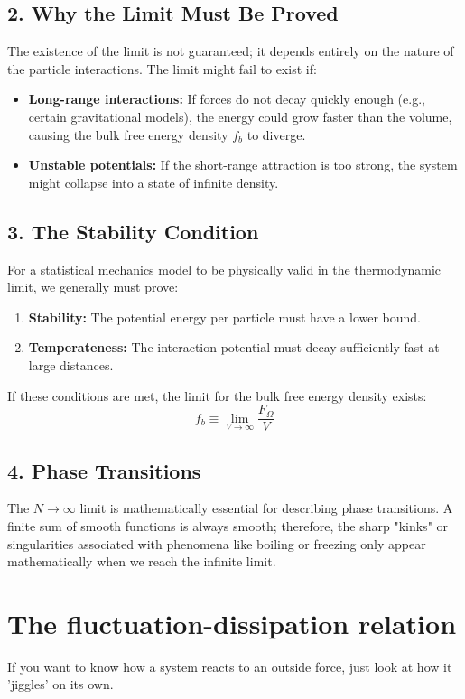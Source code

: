 \documentclass{book}
\begin{document}
\subsection*{2. Why the Limit Must Be Proved}
The existence of the limit is not guaranteed; it depends entirely on the nature of the particle interactions. The limit might fail to exist if:
\begin{itemize}
    \item \textbf{Long-range interactions:} If forces do not decay quickly enough (e.g., certain gravitational models), the energy could grow faster than the volume, causing the bulk free energy density $f_b$ to diverge.
    \item \textbf{Unstable potentials:} If the short-range attraction is too strong, the system might collapse into a state of infinite density.
\end{itemize}

\subsection*{3. The Stability Condition}
For a statistical mechanics model to be physically valid in the thermodynamic limit, we generally must prove:
\begin{enumerate}
    \item \textbf{Stability:} The potential energy per particle must have a lower bound.
    \item \textbf{Temperateness:} The interaction potential must decay sufficiently fast at large distances.
\end{enumerate}
If these conditions are met, the limit for the bulk free energy density exists:
\[ f_b \equiv \lim_{V \to \infty} \frac{F_\Omega}{V} \]

\subsection*{4. Phase Transitions}
The $N \to \infty$ limit is mathematically essential for describing phase transitions. A finite sum of smooth functions is always smooth; therefore, the sharp "kinks" or singularities associated with phenomena like boiling or freezing only appear mathematically when we reach the infinite limit.




\section{The fluctuation-dissipation relation}
\begin{tcolorbox}[colback=blue!5!white,colframe=blue!75!black,title=Key Concept]
If you want to know how a system reacts to an outside force, just look at how it 'jiggles' on its own.
\end{tcolorbox}
\end{document}
